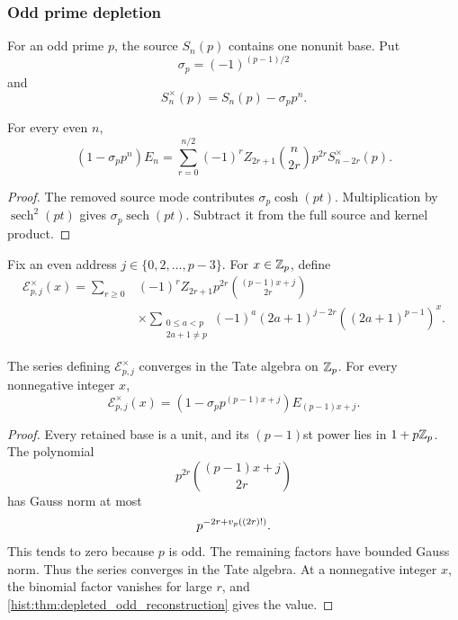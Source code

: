 \subsubsection{Odd prime depletion}

For an odd prime \(p\), the source \(S_n(p)\) contains one nonunit base. Put
\[
\sigma_p=(-1)^{(p-1)/2}
\]
and
\[
S_n^\times(p)=S_n(p)-\sigma_pp^n.
\]

\begin{histtheorem}\label{hist:thm:depleted_odd_reconstruction}
For every even \(n\),
\[
\boxed{
\left(1-\sigma_pp^n\right)E_n
=
\sum_{r=0}^{n/2}
(-1)^rZ_{2r+1}
\binom n{2r}p^{2r}S_{n-2r}^\times(p).
}
\]
\end{histtheorem}

\begin{proof}
The removed source mode contributes \(\sigma_p\cosh(pt)\). Multiplication by \(\operatorname{sech}^2(pt)\) gives \(\sigma_p\operatorname{sech}(pt)\). Subtract it from the full source and kernel product.
\end{proof}

Fix an even address \(j\in\{0,2,\ldots,p-3\}\). For \(x\in\mathbb Z_p\), define
\[
\begin{aligned}
\mathscr E_{p,j}^\times(x)
=
\sum_{r\geq0}
&(-1)^rZ_{2r+1}p^{2r}
\binom{(p-1)x+j}{2r}\\
&\times
\sum_{\substack{0\leq a<p\\2a+1\neq p}}
(-1)^a
(2a+1)^{j-2r}
\left((2a+1)^{p-1}\right)^x.
\end{aligned}
\]

\begin{histtheorem}\label{hist:thm:odd_analytic_branch}
The series defining \(\mathscr E_{p,j}^\times\) converges in the Tate algebra on \(\mathbb Z_p\). For every nonnegative integer \(x\),
\[
\boxed{
\mathscr E_{p,j}^\times(x)
=
\left(1-\sigma_pp^{(p-1)x+j}\right)
E_{(p-1)x+j}.
}
\]
\end{histtheorem}

\begin{proof}
Every retained base is a unit, and its \((p-1)\)st power lies in \(1+p\mathbb Z_p\). The polynomial
\[
p^{2r}\binom{(p-1)x+j}{2r}
\]
has Gauss norm at most
\[
p^{-2r+v_p((2r)!)}.
\]
This tends to zero because \(p\) is odd. The remaining factors have bounded Gauss norm. Thus the series converges in the Tate algebra. At a nonnegative integer \(x\), the binomial factor vanishes for large \(r\), and \cref{hist:thm:depleted_odd_reconstruction} gives the value.
\end{proof}

